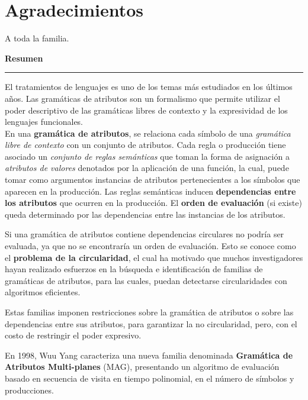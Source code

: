 \documentclass[a4paper,12pt,twoside]{ThesisStyle}
\begin{document}


\dominitoc


\cleardoublepage

\section*{Agradecimientos}

A toda la familia.

\cleardoublepage

\begin{vcenterpage}

{\large\textbf{Resumen\\}}
\noindent\rule[2pt]{\textwidth}{0.5pt}

El tratamientos de lenguajes es uno de los temas más estudiados en los últimos años.
Las gramáticas de atributos son un formalismo que permite utilizar el poder descriptivo de las gramáticas libres de contexto y la expresividad de los lenguajes funcionales.\\ 

En una \textbf{gramática de atributos}, se relaciona cada símbolo de una \textit{gramática libre de contexto} con un conjunto de atributos. Cada regla o producción tiene asociado un \textit{conjunto de reglas semánticas} que toman la forma de asignación a \textit{atributos de valores} denotados por la aplicación de una función, la cual, puede tomar como argumentos instancias de atributos pertenecientes a los símbolos que aparecen en la producción.
Las reglas semánticas inducen \textbf{dependencias entre los atributos} que ocurren en la producción. El \textbf{orden de evaluación} (si existe) queda determinado por las dependencias entre las instancias de los atributos.

Si una gramática de atributos contiene dependencias circulares no podría ser evaluada, ya que no se encontraría un orden de evaluación. Esto se conoce como el \textbf{problema de la circularidad}, el cual ha motivado que muchos investigadores hayan realizado esfuerzos en la búsqueda e identificación de familias de gramáticas de atributos, para las cuales, puedan detectarse circularidades con algoritmos eficientes.

Estas familias imponen restricciones sobre la gramática de atributos o sobre las dependencias entre sus atributos, para garantizar la no circularidad, pero, con el costo de restringir el poder expresivo.

En 1998, Wuu Yang caracteriza una nueva familia denominada \textbf{Gramática de Atributos Multi-planes} (MAG), presentando un algoritmo de evaluación basado en secuencia de visita en tiempo polinomial, en el número de símbolos y producciones.\\ 


\end{vcenterpage}
\end{document}
